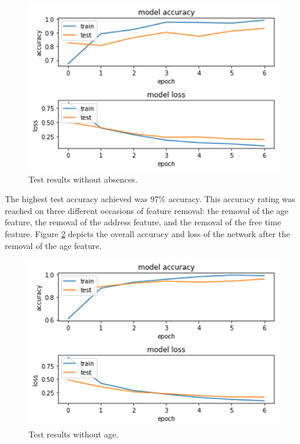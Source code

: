 \documentclass[conference]{IEEEtran}
\begin{document}
\begin{figure}[htbp]
\centerline{\includegraphics[width=\linewidth]{results3.png}}
\caption{Test results without absences.}
\label{results3}
\end{figure}

The highest test accuracy achieved was 97\% accuracy. This accuracy rating was reached on three different occasions of feature removal: the removal of the age feature, the removal of the address feature, and the removal of the free time feature. Figure \ref{results4} depicts the overall accuracy and loss of the network after the removal of the age feature.

\begin{figure}[htbp]
\centerline{\includegraphics[width=\linewidth]{results4.png}}
\caption{Test results without age.}
\label{results4}
\end{figure}
\end{document}
